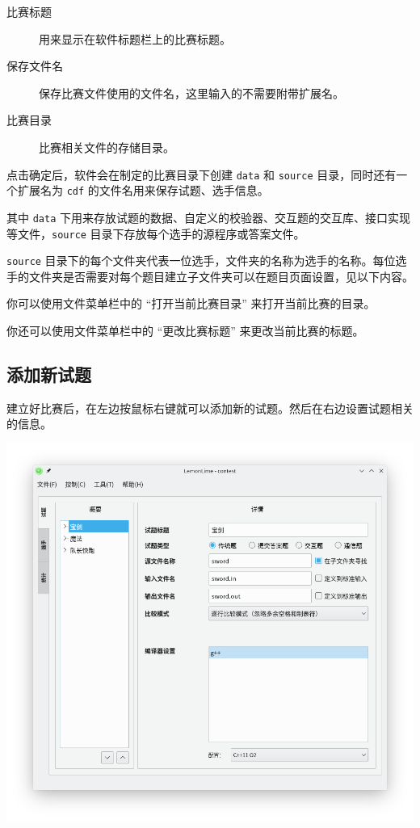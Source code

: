 \documentclass[UTF-8]{ctexart}
\begin{document}
			\begin{description}
				\item[比赛标题] 用来显示在软件标题栏上的比赛标题。
				\item[保存文件名] 保存比赛文件使用的文件名，这里输入的不需要附带扩展名。
				\item[比赛目录] 比赛相关文件的存储目录。
			\end{description}

			点击确定后，软件会在制定的比赛目录下创建 \texttt{data} 和 \texttt{source} 目录，同时还有一个扩展名为 \texttt{cdf} 的文件名用来保存试题、选手信息。

			其中 \texttt{data} 下用来存放试题的数据、自定义的校验器、交互题的交互库、接口实现等文件，\texttt{source} 目录下存放每个选手的源程序或答案文件。

			\texttt{source} 目录下的每个文件夹代表一位选手，文件夹的名称为选手的名称。每位选手的文件夹是否需要对每个题目建立子文件夹可以在题目页面设置，见以下内容。

			你可以使用文件菜单栏中的 “打开当前比赛目录” 来打开当前比赛的目录。

			你还可以使用文件菜单栏中的 “更改比赛标题” 来更改当前比赛的标题。

		\subsection{添加新试题}

			建立好比赛后，在左边按鼠标右键就可以添加新的试题。然后在右边设置试题相关的信息。

			\begin{center}
			\includegraphics[scale=0.5]{pics/editproblem.png}
			\end{center}
\end{document}
